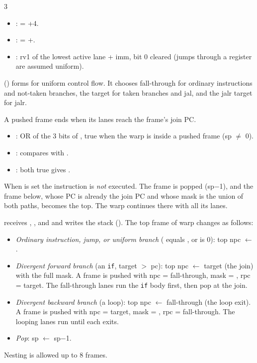 \begin{multicols*}{3}
\begin{itemize}
\item {}:  = +4.
\item \bk{+}:  = +.
\item {}: rv1 of the lowest active lane + imm, bit 0 cleared (jumps through a register are assumed uniform).
\end{itemize}
 () forms  for uniform control flow. It chooses fall-through for ordinary instructions and not-taken branches, the target for taken branches and jal, and the jalr target for jalr.

A pushed frame ends when its lanes reach the frame's join PC.
\begin{itemize}
\item {}: OR of the 3 bits of , true when the warp is inside a pushed frame (sp $\neq$ 0).
\item \bk{=}: compares  with .
\item {}: both true gives .
\end{itemize}
When  is set the instruction is \emph{not} executed. The frame is popped (sp$-$1), and the frame below, whose PC is already the join PC and whose mask is the union of both paths, becomes the top. The warp continues there with all its lanes.

 receives , ,  and  and writes the stack (). The top frame of warp  changes as follows:
\begin{itemize}
\item \emph{Ordinary instruction, jump, or uniform branch} ( equals , or is 0): top npc $\gets$ .
\item \emph{Divergent forward branch} (an \texttt{if}, target $>$ pc): top npc $\gets$ target (the join) with the full mask. A frame is pushed with npc = fall-through, mask = , rpc = target. The fall-through lanes run the \texttt{if} body first, then pop at the join.
\item \emph{Divergent backward branch} (a loop): top npc $\gets$ fall-through (the loop exit). A frame is pushed with npc = target, mask = , rpc = fall-through. The looping lanes run until each exits.
\item \emph{Pop}: sp $\gets$ sp$-$1.
\end{itemize}
Nesting is allowed up to 8 frames.


\end{multicols*}
